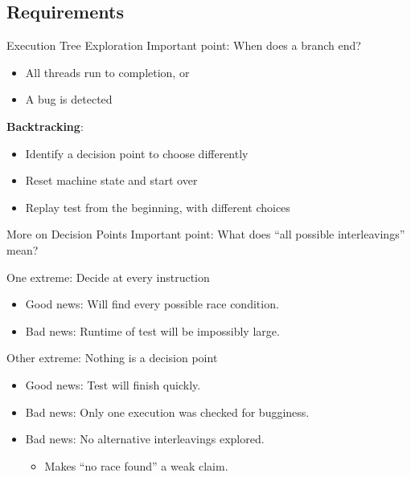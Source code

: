 \documentclass[xcolor=dvipsnames]{beamer}
\begin{document}
\subsection{Requirements}


\begin{frame}{Execution Tree Exploration}
	Important point: When does a branch end?
	\begin{itemize}
		\item All threads run to completion, or
		\item A bug is detected %
	\end{itemize}
	{\bf Backtracking}:
	\begin{itemize}
		\item Identify a decision point to choose differently
		\item Reset machine state and start over
		\item Replay test from the beginning, with different choices
	\end{itemize}
\end{frame}


\begin{frame}{More on Decision Points}
	Important point: What does ``all possible interleavings'' mean?

	\linegap
	One extreme: Decide at every instruction
	\begin{itemize}
		\item Good news: Will find every possible race condition.
		\item Bad news: Runtime of test will be impossibly large.
	\end{itemize}
	\linegap

	Other extreme: Nothing is a decision point
	\begin{itemize}
		\item Good news: Test will finish quickly.
		\item Bad news: Only one execution was checked for bugginess.
		\item Bad news: No alternative interleavings explored.
		\begin{itemize}
			\item Makes ``no race found'' a weak claim.
		\end{itemize}
	\end{itemize}
\end{frame}
\end{document}
